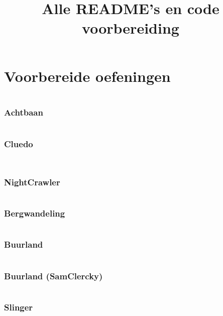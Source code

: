 \documentclass{article}
\title{Alle README's en code voorbereiding}
\begin{document}
    \maketitle

    \part{Voorbereide oefeningen}

    
    \inputminted{python}{../2011/bowling/oplossing.py3}

    \section{Achtbaan}
    \inputminted{python}{../2017/achtbaan/oplossing.py3}

    \section{Cluedo}
    \inputminted{python}{../2017/cluedo/oplossing.py3}

    
    \inputminted{python}{../2017/naomees/oplossing.py3}

    \section{NightCrawler}
    \inputminted{python}{../2017/nightcrawler/oplossing.py3}
    

    \section{Bergwandeling}
    \inputminted{python}{../2018/bergwandeling/bergwandeling.py}

    \section{Buurland}
    \inputminted{python}{../2018/buurland/buurland.py}

    \section{Buurland (SamClercky)}
    \inputminted{python}{../2018/buurlanden_samclercky/oplossing.py3}

    \section{Slinger}
    \inputminted{python}{../2018/slinger/oplossing.py3}
\end{document}
